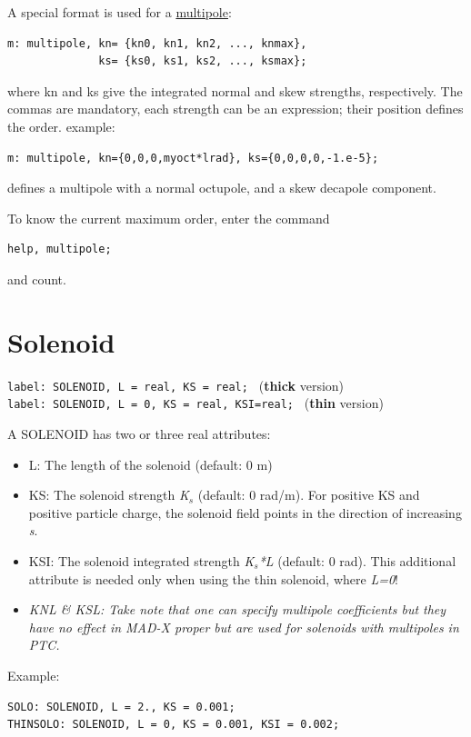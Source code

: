 A special format is used for a \href{multipole.html}{multipole}: 
\begin{verbatim}
m: multipole, kn= {kn0, kn1, kn2, ..., knmax},
              ks= {ks0, ks1, ks2, ..., ksmax};
\end{verbatim} 
where kn and ks give the integrated normal and skew strengths,
respectively. The commas are mandatory, each strength can be an
expression; their position defines the order. example:  
\begin{verbatim}
m: multipole, kn={0,0,0,myoct*lrad}, ks={0,0,0,0,-1.e-5};
\end{verbatim} 
defines a multipole with a normal octupole, and a skew decapole component. 

To know the current maximum order, enter the command 
\begin{verbatim}
help, multipole;
\end{verbatim} 
and count.

%
\section{Solenoid}
\label{sec:solenoid}

\texttt{label: SOLENOID, L = real, KS = real;           } (\textbf{thick} version) 
\\
\texttt{label: SOLENOID, L = 0,    KS = real, KSI=real; } (\textbf{thin} version) 

A SOLENOID has two or three real attributes: 
\begin{itemize}
   \item L: The length of the solenoid (default: 0 m) 
   \item KS: The solenoid strength \textit{K$_s$} (default: 0
     rad/m). For positive KS and positive particle charge, the solenoid
     field points in the direction of increasing \textit{s}.  
   \item KSI: The solenoid integrated strength \textit{K$_s$*L}
     (default: 0 rad).  This additional attribute is needed only when
     using the thin solenoid,  where \textit{L=0}!     
   \item \textit{ KNL \& KSL:  Take note that one can specify multipole
     coefficients but they have no effect in MAD-X proper but are used
     for solenoids with multipoles in PTC.} 
\end{itemize}

Example: 
\begin{verbatim}
SOLO: SOLENOID, L = 2., KS = 0.001;
THINSOLO: SOLENOID, L = 0, KS = 0.001, KSI = 0.002;
\end{verbatim}

